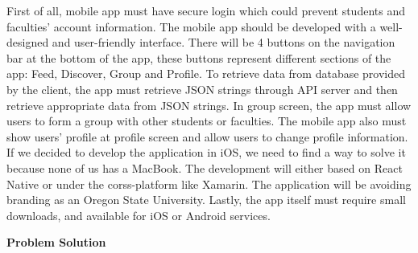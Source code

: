 \documentclass[10pt,letterpaper]{article}
\begin{document}
First of all, mobile app must have secure login which could prevent students and faculties’ account information. The mobile app should be developed with a well-designed and user-friendly interface. There will be 4 buttons on the navigation bar at the bottom of the app, these buttons represent different sections of the app: Feed, Discover, Group and Profile. To retrieve data from database provided by the client, the app must retrieve JSON strings through API server and then retrieve appropriate data from JSON strings. In group screen, the app must allow users to form a group with other students or faculties. The mobile app also must show users’ profile at profile screen and allow users to change profile information. If we decided to develop the application in iOS, we need to find a way to solve it because none of us has a MacBook. The development will either based on React Native or under the corss-platform like Xamarin. The application will be avoiding branding as an Oregon State University. Lastly, the app itself must require small downloads, and available for iOS or Android services. \\

\begin{center}
\large
\textbf{Problem Solution}
\end{center}
\end{document}
